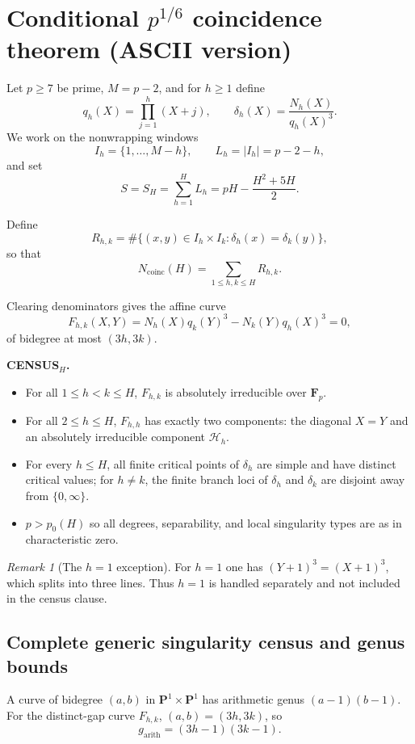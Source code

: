 \documentclass[11pt]{article}
\theoremstyle{remark}
\newtheorem{remark}[theorem]{Remark}
\newcommand{\Fp}{\mathbf F_p}
\newcommand{\Ncoinc}{N_{\mathrm{coinc}}}
\begin{document}
\section*{Conditional $p^{1/6}$ coincidence theorem (ASCII version)}

Let $p \ge 7$ be prime, $M = p-2$, and for $h \ge 1$ define
\[
q_h(X) = \prod_{j=1}^h (X+j), \qquad
\delta_h(X) = \frac{N_h(X)}{q_h(X)^3}.
\]
We work on the nonwrapping windows
\[
I_h = \{1,\dots,M-h\}, \qquad L_h = |I_h| = p-2-h,
\]
and set
\[
S = S_H = \sum_{h=1}^H L_h = pH - \frac{H^2+5H}{2}.
\]

Define
\[
R_{h,k} = \#\{(x,y)\in I_h \times I_k : \delta_h(x) = \delta_k(y)\},
\]
so that
\[
\Ncoinc(H) = \sum_{1 \le h,k \le H} R_{h,k}.
\]

Clearing denominators gives the affine curve
\[
F_{h,k}(X,Y) = N_h(X) q_k(Y)^3 - N_k(Y) q_h(X)^3 = 0,
\]
of bidegree at most $(3h,3k)$.

\medskip

\noindent
\textbf{CENSUS$_H$.}
\begin{itemize}
\item For all $1 \le h < k \le H$, $F_{h,k}$ is absolutely irreducible over $\Fp$.
\item For all $2 \le h \le H$, $F_{h,h}$ has exactly two components:
the diagonal $X=Y$ and an absolutely irreducible component $\mathcal H_h$.
\item For every $h \le H$, all finite critical points of $\delta_h$ are
simple and have distinct critical values; for $h \ne k$, the finite branch
loci of $\delta_h$ and $\delta_k$ are disjoint away from $\{0,\infty\}$.
\item $p > p_0(H)$ so all degrees, separability, and local singularity types
are as in characteristic zero.
\end{itemize}

\begin{remark}[The $h=1$ exception]
For $h=1$ one has $(Y+1)^3 = (X+1)^3$, which splits into three lines.
Thus $h=1$ is handled separately and not included in the census clause.
\end{remark}

\subsection*{Complete generic singularity census and genus bounds}

A curve of bidegree $(a,b)$ in $\mathbf P^1 \times \mathbf P^1$ has arithmetic genus $(a-1)(b-1)$.
For the distinct-gap curve $F_{h,k}$, $(a,b)=(3h,3k)$, so
\[
g_{\mathrm{arith}} = (3h-1)(3k-1).
\]
\end{document}
